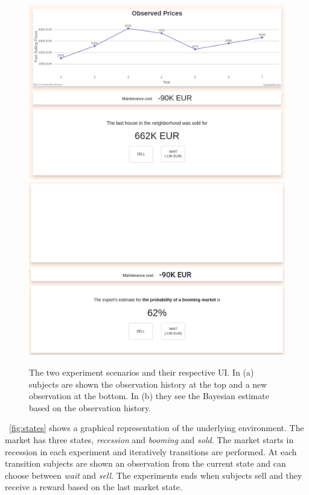 \begin{figure}[!htbp]
    \centering
    \includegraphics[width=0.99\linewidth]{img/methods/experiment_obs_1.png}\\
    \includegraphics[width=0.99\linewidth]{img/methods/experiment_bel_1.png}\\
    \caption{The two experiment scenarios and their respective UI. In (a) subjects are shown the observation history at the top and a new observation at the bottom. In (b) they see the Bayesian estimate based on the observation history.}\label{fig:user-interface}
\end{figure}

~\autoref{fig:states} shows a graphical representation of the underlying environment. The market has three states, \textit{recession} and \textit{booming} and \textit{sold}. The market starts in recession in each experiment and iteratively transitions are performed. At each transition subjects are shown an observation from the current state and can choose between \textit{wait} and \textit{sell}. The experiments ends when subjects sell and they receive a reward based on the last market state.

